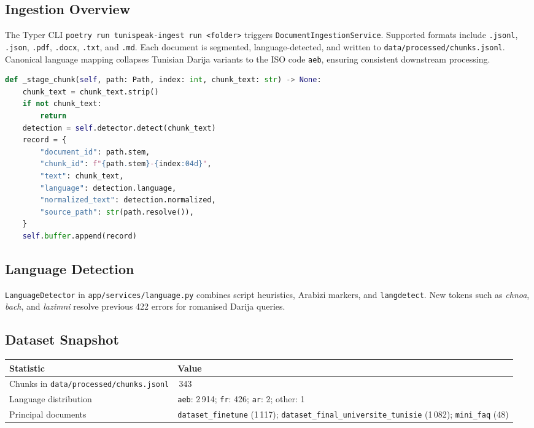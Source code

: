 \documentclass[12pt]{article}
\begin{document}
\subsection{Ingestion Overview}
The Typer CLI \texttt{poetry run tunispeak-ingest run <folder>} triggers \texttt{DocumentIngestionService}. Supported formats include \texttt{.jsonl}, \texttt{.json}, \texttt{.pdf}, \texttt{.docx}, \texttt{.txt}, and \texttt{.md}. Each document is segmented, language-detected, and written to \texttt{data/processed/chunks.jsonl}. Canonical language mapping collapses Tunisian Darija variants to the ISO code \texttt{aeb}, ensuring consistent downstream processing.

\begin{lstlisting}[language=Python,caption={Chunk staging inside DocumentIngestionService}]
def _stage_chunk(self, path: Path, index: int, chunk_text: str) -> None:
    chunk_text = chunk_text.strip()
    if not chunk_text:
        return
    detection = self.detector.detect(chunk_text)
    record = {
        "document_id": path.stem,
        "chunk_id": f"{path.stem}-{index:04d}",
        "text": chunk_text,
        "language": detection.language,
        "normalized_text": detection.normalized,
        "source_path": str(path.resolve()),
    }
    self.buffer.append(record)
\end{lstlisting}

\subsection{Language Detection}
\texttt{LanguageDetector} in \texttt{app/services/language.py} combines script heuristics, Arabizi markers, and \texttt{langdetect}. New tokens such as \textit{chnoa}, \textit{bach}, and \textit{lazimni} resolve previous 422 errors for romanised Darija queries.

\subsection{Dataset Snapshot}
\begin{longtable}{>{\raggedright\arraybackslash}p{5cm} >{\raggedright\arraybackslash}p{9cm}}
\toprule
Statistic & Value \\
\midrule
Chunks in \texttt{data/processed/chunks.jsonl} & 3\,343 \\
Language distribution & \texttt{aeb}: 2\,914; \texttt{fr}: 426; \texttt{ar}: 2; other: 1 \\
Principal documents & \texttt{dataset\_finetune} (1\,117); \texttt{dataset\_final\_universite\_tunisie} (1\,082); \texttt{mini\_faq} (48) \\
\bottomrule
\end{longtable}
\end{document}
